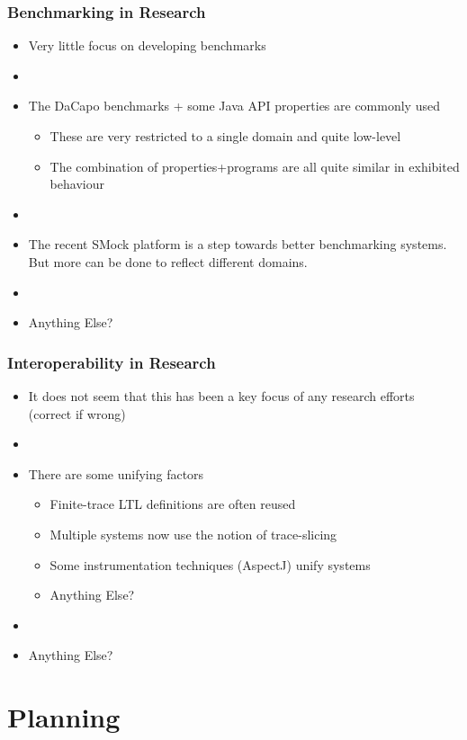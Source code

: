 \documentclass{beamer}
\newcommand{\addhere}{{\color{red} Anything Else?}}
\begin{document}
\begin{frame}
\frametitle{Benchmarking in Research}
\begin{itemize}
	\item Very little focus on developing benchmarks
	\item[]
	\item The DaCapo benchmarks + some Java API properties are commonly used
	\begin{itemize}
		\item These are very restricted to a single domain and quite low-level
		\item The combination of properties+programs are all quite similar in exhibited behaviour
	\end{itemize}
	\item[]
	\item The recent SMock platform is a step towards better benchmarking systems. But more can be done to reflect different domains.
	\item[]
	\item \addhere{}
\end{itemize}
\end{frame}

\begin{frame}
\frametitle{Interoperability in Research}
\begin{itemize}
	\item It does not seem that this has been a key focus of any research efforts (correct if wrong)
	\item[]
	\item There are some unifying factors
	\begin{itemize}
		\item Finite-trace LTL definitions are often reused
		\item Multiple systems now use the notion of trace-slicing
		\item Some instrumentation techniques (AspectJ) unify systems
		\item \addhere{}
	\end{itemize}
	\item[]
	\item \addhere{}
\end{itemize}
\end{frame}

\section{Planning}
\end{document}
